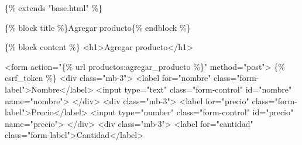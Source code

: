 \documentclass[
  a4paper,
  DIV=11,
  numbers=noendperiod,
  onepage,
  openany]{scrreprt}
\newenvironment{Shaded}{\begin{snugshade}}{\end{snugshade}}
\newcommand{\DataTypeTok}[1]{\textcolor[rgb]{0.68,0.00,0.00}{#1}}
\newcommand{\KeywordTok}[1]{\textcolor[rgb]{0.00,0.23,0.31}{#1}}
\newcommand{\NormalTok}[1]{\textcolor[rgb]{0.00,0.23,0.31}{#1}}
\newcommand{\OperatorTok}[1]{\textcolor[rgb]{0.37,0.37,0.37}{#1}}
\newcommand{\OtherTok}[1]{\textcolor[rgb]{0.00,0.23,0.31}{#1}}
\newcommand{\StringTok}[1]{\textcolor[rgb]{0.13,0.47,0.30}{#1}}
\begin{document}
\begin{Shaded}
\begin{Highlighting}[]
\NormalTok{\{\% extends "base.html" \%\}}

\NormalTok{\{\% block title \%\}Agregar producto\{\% endblock \%\}}

\NormalTok{\{\% block content \%\}}
\DataTypeTok{\textless{}}\KeywordTok{h1}\DataTypeTok{\textgreater{}}\NormalTok{Agregar producto}\DataTypeTok{\textless{}/}\KeywordTok{h1}\DataTypeTok{\textgreater{}}

\DataTypeTok{\textless{}}\KeywordTok{form}\OtherTok{ action}\OperatorTok{=}\StringTok{"\{\% url \textquotesingle{}productos:agregar\_producto\textquotesingle{} \%\}"}\OtherTok{ method}\OperatorTok{=}\StringTok{"post"}\DataTypeTok{\textgreater{}}
\NormalTok{    \{\% csrf\_token \%\}}
    \DataTypeTok{\textless{}}\KeywordTok{div}\OtherTok{ class}\OperatorTok{=}\StringTok{"mb{-}3"}\DataTypeTok{\textgreater{}}
        \DataTypeTok{\textless{}}\KeywordTok{label}\OtherTok{ for}\OperatorTok{=}\StringTok{"nombre"}\OtherTok{ class}\OperatorTok{=}\StringTok{"form{-}label"}\DataTypeTok{\textgreater{}}\NormalTok{Nombre}\DataTypeTok{\textless{}/}\KeywordTok{label}\DataTypeTok{\textgreater{}}
        \DataTypeTok{\textless{}}\KeywordTok{input}\OtherTok{ type}\OperatorTok{=}\StringTok{"text"}\OtherTok{ class}\OperatorTok{=}\StringTok{"form{-}control"}\OtherTok{ id}\OperatorTok{=}\StringTok{"nombre"}\OtherTok{ name}\OperatorTok{=}\StringTok{"nombre"}\DataTypeTok{\textgreater{}}
    \DataTypeTok{\textless{}/}\KeywordTok{div}\DataTypeTok{\textgreater{}}
    \DataTypeTok{\textless{}}\KeywordTok{div}\OtherTok{ class}\OperatorTok{=}\StringTok{"mb{-}3"}\DataTypeTok{\textgreater{}}
        \DataTypeTok{\textless{}}\KeywordTok{label}\OtherTok{ for}\OperatorTok{=}\StringTok{"precio"}\OtherTok{ class}\OperatorTok{=}\StringTok{"form{-}label"}\DataTypeTok{\textgreater{}}\NormalTok{Precio}\DataTypeTok{\textless{}/}\KeywordTok{label}\DataTypeTok{\textgreater{}}
        \DataTypeTok{\textless{}}\KeywordTok{input}\OtherTok{ type}\OperatorTok{=}\StringTok{"number"}\OtherTok{ class}\OperatorTok{=}\StringTok{"form{-}control"}\OtherTok{ id}\OperatorTok{=}\StringTok{"precio"}\OtherTok{ name}\OperatorTok{=}\StringTok{"precio"}\DataTypeTok{\textgreater{}}
    \DataTypeTok{\textless{}/}\KeywordTok{div}\DataTypeTok{\textgreater{}}
    \DataTypeTok{\textless{}}\KeywordTok{div}\OtherTok{ class}\OperatorTok{=}\StringTok{"mb{-}3"}\DataTypeTok{\textgreater{}}
        \DataTypeTok{\textless{}}\KeywordTok{label}\OtherTok{ for}\OperatorTok{=}\StringTok{"cantidad"}\OtherTok{ class}\OperatorTok{=}\StringTok{"form{-}label"}\DataTypeTok{\textgreater{}}\NormalTok{Cantidad}\DataTypeTok{\textless{}/}\KeywordTok{label}\DataTypeTok{\textgreater{}}

\end{Highlighting}
\end{Shaded}
\end{document}
